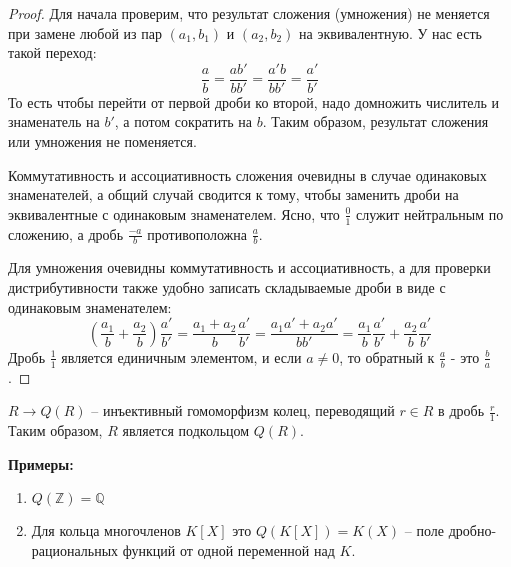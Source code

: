 \begin{proof}
    Для начала проверим, что результат сложения (умножения) не меняется при замене любой из пар $(a_1, b_1)$ и $(a_2, b_2)$ на эквивалентную.
    У нас есть такой переход:
    \[ \frac{a}{b} = \frac{ab'}{bb'} = \frac{a'b}{bb'} = \frac{a'}{b'} \]
    То есть чтобы перейти от первой дроби ко второй, надо домножить числитель и знаменатель на $b'$, а потом сократить на $b$. Таким образом, результат сложения или умножения не поменяется.
    
    Коммутативность и ассоциативность сложения очевидны в случае одинаковых знаменателей, а общий случай сводится к тому, чтобы заменить дроби на эквивалентные с одинаковым знаменателем.
    Ясно, что $\frac{0}{1}$ служит нейтральным по сложению, а дробь $\frac{-a}{b}$ противоположна $\frac{a}{b}$.
    
    Для умножения очевидны коммутативность и ассоциативность, 
    а для проверки дистрибутивности также удобно записать складываемые дроби в виде с одинаковым знаменателем:
    \[ (\frac{a_1}{b} + \frac{a_2}{b})\frac{a'}{b'} = \frac{a_1 + a_2}{b}\frac{a'}{b'} 
    = \frac{a_1a' + a_2a'}{bb'} = \frac{a_1}{b}\frac{a'}{b'} + \frac{a_2}{b}\frac{a'}{b'} \]
    Дробь $\frac{1}{1}$ является единичным элементом, и если $a \neq 0$, то обратный к $\frac{a}{b}$ - это $\frac{b}{a}$.
\end{proof}

\begin{notice}
    $R \to Q(R)$ -- инъективный гомоморфизм колец, переводящий $r \in R$ в дробь $\frac{r}{1}$. Таким образом, $R$ является подкольцом $Q(R)$.
\end{notice}

\textbf{Примеры:}
\begin{enumerate}
    \item $Q(\mathbb{Z}) = \mathbb{Q}$
    \item Для кольца многочленов $K[X]$ это $Q(K[X]) = K(X)$ -- поле дробно-рациональных функций от одной переменной над $K$.
\end{enumerate}
